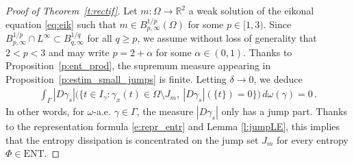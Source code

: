 \documentclass[fleqn
]{article}
\numberwithin{equation}{section}
\newcommand{\R}{{\mathbb R}}
\theoremstyle{definition}
\begin{document}
\begin{proof}[Proof of Theorem~\ref{t:rectif}]
Let $m\colon \Omega\to\R^2$ a weak solution of the eikonal equation \eqref{eq:eik} such that $m\in B^{1/p}_{p,\infty}(\Omega)$ for some $p\in [1,3)$.
Since $B^{1/p}_{p,\infty}\cap L^\infty \subset B^{1/q}_{q,\infty}$ for all $q \geq p$, we assume without loss of generality that $2<p<3$ and may write $p=2+\alpha$ for some $\alpha\in (0,1)$.
Thanks to Proposition~\ref{p:ent_prod}, the supremum measure appearing in Proposition~\ref{p:estim_small_jumps} is finite.
Letting $\delta\to 0$, we deduce 
\begin{align*}
\int_{\Gamma} 
|D\gamma_s|
\big(
\lbrace 
t\in I_\gamma\colon \gamma_x(t) \in \Omega \setminus J_m, \ 
|D\gamma_s|(\lbrace t\rbrace )=0\rbrace\big)
\,d\omega(\gamma) =0\,.
\end{align*}
In other words, for $\omega$-a.e. $\gamma\in \Gamma$, the measure $|D\gamma_s|$ only has a jump part.
Thanks to the representation formula \eqref{e:repr_entr} and Lemma \ref{l:jumpLE}, this implies that the entropy dissipation is concentrated on the jump set $J_m$ for every entropy $\Phi \in \mathrm{ENT}$.
\end{proof}
\end{document}
